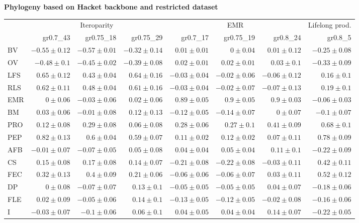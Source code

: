 \begin{landscape}
\begin{table}
\begin{footnotesize}
\textbf{Phylogeny based on Hacket backbone and restricted dataset}

\begin{tabular}{@{}l|rrr|rrr|r@{}}
\toprule
 & \multicolumn{3}{c|}{Iteroparity} & \multicolumn{3}{c|}{EMR} & \multicolumn{1}{c}{Lifelong prod.}\\
 & gr0.7\_43 & gr0.75\_18 & gr0.75\_29 & gr0.7\_17 & gr0.75\_19 & gr0.8\_24 & gr0.8\_5\\
\midrule
BV & $-0.55 \pm 0.12$ & $-0.57 \pm 0.01$ & $-0.32 \pm 0.14$ & $0.01 \pm 0.01$ & $0 \pm 0.04$ & $0.01 \pm 0.12$ & $-0.25 \pm 0.08$\\
OV & $-0.48 \pm 0.1$ & $-0.45 \pm 0.02$ & $-0.39 \pm 0.08$ & $0.02 \pm 0.01$ & $0.02 \pm 0.01$ & $0.03 \pm 0.1$ & $-0.33 \pm 0.09$\\
LFS & $0.65 \pm 0.12$ & $0.43 \pm 0.04$ & $0.64 \pm 0.16$ & $-0.03 \pm 0.04$ & $-0.02 \pm 0.06$ & $-0.06 \pm 0.12$ & $0.16 \pm 0.1$\\
RLS & $0.62 \pm 0.11$ & $0.48 \pm 0.04$ & $0.61 \pm 0.16$ & $-0.03 \pm 0.04$ & $-0.02 \pm 0.07$ & $-0.07 \pm 0.13$ & $0.19 \pm 0.1$\\
EMR & $0 \pm 0.06$ & $-0.03 \pm 0.06$ & $0.02 \pm 0.06$ & $0.89 \pm 0.05$ & $0.9 \pm 0.05$ & $0.9 \pm 0.03$ & $-0.06 \pm 0.03$\\
BM & $0.03 \pm 0.06$ & $-0.01 \pm 0.08$ & $0.12 \pm 0.13$ & $-0.12 \pm 0.05$ & $-0.14 \pm 0.07$ & $0 \pm 0.07$ & $-0.1 \pm 0.07$\\
PRO & $0.12 \pm 0.08$ & $0.29 \pm 0.08$ & $0.06 \pm 0.08$ & $0.28 \pm 0.06$ & $0.27 \pm 0.1$ & $0.41 \pm 0.09$ & $0.68 \pm 0.1$\\
PEP & $0.82 \pm 0.13$ & $0.6 \pm 0.04$ & $0.59 \pm 0.07$ & $0.11 \pm 0.02$ & $0.12 \pm 0.02$ & $0.07 \pm 0.11$ & $0.78 \pm 0.09$\\
AFB & $-0.01 \pm 0.07$ & $-0.07 \pm 0.05$ & $0.05 \pm 0.08$ & $0.04 \pm 0.04$ & $0.05 \pm 0.04$ & $0.11 \pm 0.1$ & $-0.22 \pm 0.09$\\
CS & $0.15 \pm 0.08$ & $0.17 \pm 0.08$ & $0.14 \pm 0.07$ & $-0.21 \pm 0.08$ & $-0.22 \pm 0.08$ & $-0.03 \pm 0.11$ & $0.42 \pm 0.11$\\
FEC & $0.32 \pm 0.13$ & $0.4 \pm 0.09$ & $0.21 \pm 0.06$ & $-0.06 \pm 0.06$ & $-0.06 \pm 0.07$ & $0.03 \pm 0.11$ & $0.52 \pm 0.12$\\
DP & $0 \pm 0.08$ & $-0.07 \pm 0.07$ & $0.13 \pm 0.1$ & $-0.05 \pm 0.05$ & $-0.05 \pm 0.05$ & $0.04 \pm 0.07$ & $-0.18 \pm 0.06$\\
FLE & $0.02 \pm 0.09$ & $-0.05 \pm 0.06$ & $0.14 \pm 0.1$ & $-0.13 \pm 0.05$ & $-0.12 \pm 0.05$ & $-0.02 \pm 0.08$ & $-0.16 \pm 0.06$\\
I & $-0.03 \pm 0.07$ & $-0.1 \pm 0.06$ & $0.06 \pm 0.1$ & $0.04 \pm 0.05$ & $0.04 \pm 0.04$ & $0.14 \pm 0.07$ & $-0.22 \pm 0.05$\\
\bottomrule
\end{tabular}

\end{footnotesize}
\end{table}
\end{landscape}


